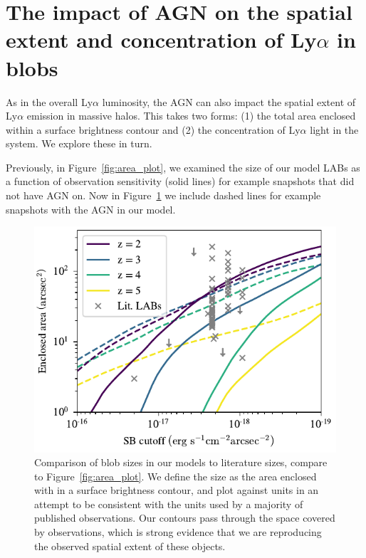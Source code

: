 \section{The impact of AGN on the spatial extent and concentration of Ly\texorpdfstring{$\alpha$}{a} in blobs}

As in the overall Ly$\alpha$ luminosity, the AGN can also impact the spatial extent of Ly$\alpha$ emission in massive halos.
This takes two forms: (1) the total area enclosed within a surface brightness contour and (2) the concentration of Ly$\alpha$ light in the system.
We explore these in turn.

Previously, in Figure~\ref{fig:area_plot}, we examined the size of our model LABs as a function of observation sensitivity (solid lines) for example snapshots that did not have AGN on.
Now in Figure~\ref{fig:agn_area_plot} we include dashed lines for example snapshots with the AGN in our model.

\begin{figure}
    \centering
    \includegraphics[width=\textwidth,keepaspectratio]{figures/agn_area_profile.pdf}
    \caption{
        Comparison of blob sizes in our models to literature sizes, compare to Figure~\ref{fig:area_plot}.
        We define the size as the area enclosed with in a surface brightness contour, and plot against units in an attempt to be consistent with the units used by a majority of published observations.
        Our contours pass through the space covered by observations, which is strong evidence that we are reproducing the observed spatial extent of these objects.
    }
  \label{fig:agn_area_plot}
\end{figure}

